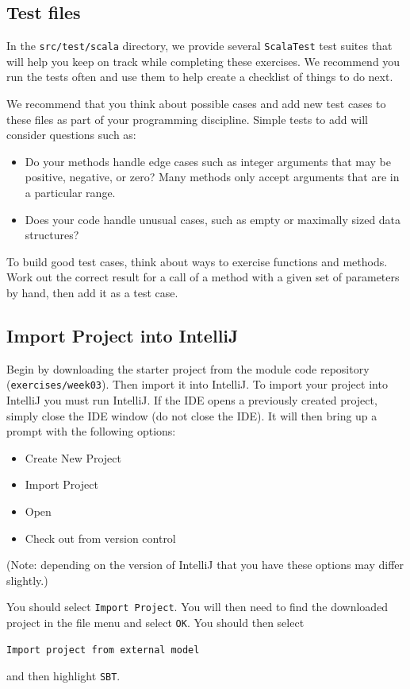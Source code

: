 \documentclass[12pt,a4paper]{exam}
\begin{document}
\subsection*{Test files}

In the \texttt{src/test/scala} directory, we provide several \verb!ScalaTest! test suites that will 
help you keep on track while completing these exercises. 
We recommend you run the tests often and use them to help create a checklist of things to do next.

We recommend that you think about possible cases and add new test cases to these 
files as part of your programming discipline. Simple tests to add will consider questions such as:
\begin{itemize}
	\item Do your methods handle edge cases such as integer arguments that may be positive, 
	negative, or zero? Many methods only accept arguments that are in a particular range.
	\item Does your code handle unusual cases, such as empty or maximally sized data structures?	
\end{itemize}
To build good test cases, think about ways to exercise functions and methods. 
Work out the correct result for a call of a method with a given set of parameters by hand, 
then add it as a test case.

\subsection*{Import Project into IntelliJ}

Begin by downloading the starter project from the module code repository (\verb!exercises/week03!).
Then import it into IntelliJ. To import your project into IntelliJ you must run IntelliJ. 
If the IDE opens a previously created project, simply close the IDE window (do not close the IDE). 
It will then bring up a prompt with the following options:
\begin{itemize}
	\item Create New Project
	\item Import Project
	\item Open
	\item Check out from version control	
\end{itemize}
(Note: depending on the version of IntelliJ that you have these options may differ slightly.)

You should select \verb!Import Project!. You will then need to find the downloaded project in the file menu 
and select \verb!OK!. You should then select 
\begin{Verbatim}
Import project from external model
\end{Verbatim}
 and then highlight \verb!SBT!.
\end{document}
